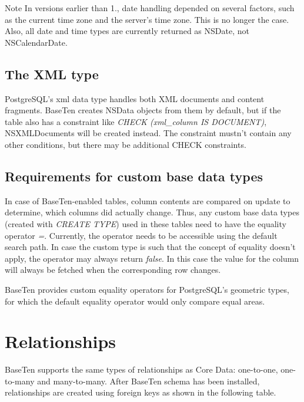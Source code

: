 \begin{DoxyNote}{Note}
In versions earlier than 1., date handling depended on several factors, such as the current time zone and the server's time zone. This is no longer the case. Also, all date and time types are currently returned as N\+S\+Date, not N\+S\+Calendar\+Date.
\end{DoxyNote}
\hypertarget{database_types_xml_handling}{}\subsection{The X\+M\+L type}\label{database_types_xml_handling}
Postgre\+S\+Q\+L's xml data type handles both X\+M\+L documents and content fragments. Base\+Ten creates N\+S\+Data objects from them by default, but if the table also has a constraint like {\itshape C\+H\+E\+C\+K (xml\+\_\+column I\+S D\+O\+C\+U\+M\+E\+N\+T)}, N\+S\+X\+M\+L\+Documents will be created instead. The constraint mustn't contain any other conditions, but there may be additional C\+H\+E\+C\+K constraints.\hypertarget{database_types_custom_database_types}{}\subsection{Requirements for custom base data types}\label{database_types_custom_database_types}
In case of Base\+Ten-\/enabled tables, column contents are compared on update to determine, which columns did actually change. Thus, any custom base data types (created with {\itshape C\+R\+E\+A\+T\+E T\+Y\+P\+E}) used in these tables need to have the equality operator {\itshape =}. Currently, the operator needs to be accessible using the default search path. In case the custom type is such that the concept of equality doesn't apply, the operator may always return {\itshape false}. In this case the value for the column will always be fetched when the corresponding row changes.

Base\+Ten provides custom equality operators for Postgre\+S\+Q\+L's geometric types, for which the default equality operator would only compare equal areas. \hypertarget{relationships}{}\section{Relationships}\label{relationships}
Base\+Ten supports the same types of relationships as Core Data\+: one-\/to-\/one, one-\/to-\/many and many-\/to-\/many. After Base\+Ten schema has been installed, relationships are created using foreign keys as shown in the following table.

